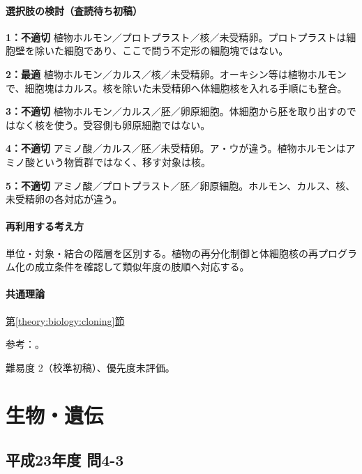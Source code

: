 \paragraph{選択肢の検討（査読待ち初稿）}\mbox{}\par

\noindent\textbf{1：不適切} 植物ホルモン／プロトプラスト／核／未受精卵。プロトプラストは細胞壁を除いた細胞であり、ここで問う不定形の細胞塊ではない。\par

\noindent\textbf{2：最適} 植物ホルモン／カルス／核／未受精卵。オーキシン等は植物ホルモンで、細胞塊はカルス。核を除いた未受精卵へ体細胞核を入れる手順にも整合。\par

\noindent\textbf{3：不適切} 植物ホルモン／カルス／胚／卵原細胞。体細胞から胚を取り出すのではなく核を使う。受容側も卵原細胞ではない。\par

\noindent\textbf{4：不適切} アミノ酸／カルス／胚／未受精卵。ア・ウが違う。植物ホルモンはアミノ酸という物質群ではなく、移す対象は核。\par

\noindent\textbf{5：不適切} アミノ酸／プロトプラスト／胚／卵原細胞。ホルモン、カルス、核、未受精卵の各対応が違う。\par

\paragraph{再利用する考え方} 単位・対象・結合の階層を区別する。植物の再分化制御と体細胞核の再プログラム化の成立条件を確認して類似年度の肢順へ対応する。

\paragraph{共通理論} \hyperref[theory:biology:cloning]{第\ref*{theory:biology:cloning}節}

\par 参考：\cite{plant_regeneration,nhgri_cloning}。

\par 難易度 2（校準初稿）、優先度未評価。

\section{生物・遺伝}

\subsection{平成23年度 問4-3}
\label{q:h23-reg-basic-4-3}

